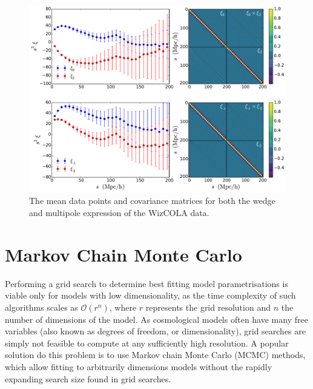\documentclass[titlesmallcaps, examinerscopy, copyrightpage]{uqthesis}
\begin{document}
\begin{figure}[h!]
  \begin{center}
    \includegraphics[width=\textwidth]{images/wizcola.pdf}
  \end{center}
  \caption{The mean data points and covariance matrices for both the wedge and multipole expression of the WizCOLA data.}
  \label{fig:wizcola}
\end{figure}


\section{Markov Chain Monte Carlo}

Performing a grid search to determine best fitting model parametrisations is viable only for models with low dimensionality, as the time complexity of such algorithms scales as $\mathcal{O}(r^n)$, where $r$ represents the grid resolution and $n$ the number of dimensions of the model. As cosmological models often have many free variables (also known as degrees of freedom, or dimensionality), grid searches are simply not feasible to compute at any sufficiently high resolution. A popular solution do this problem is to use Markov chain Monte Carlo (MCMC) methods, which allow fitting to arbitrarily dimensions models without the rapidly expanding search size found in grid searches.
\end{document}
